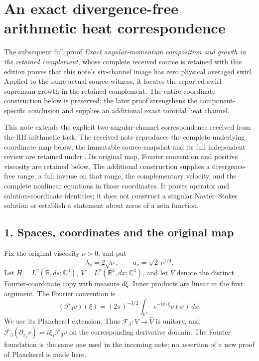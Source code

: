 \section*{An exact divergence-free arithmetic heat correspondence}

The subsequent full proof \emph{Exact angular-momentum composition and growth in the retained complement}, whose complete received source is retained with this edition proves that this note's six-channel image has zero physical averaged swirl. Applied to the same actual source witness, it locates the reported swirl supremum growth in the retained complement. The entire coordinate construction below is preserved; the later proof strengthens the component-specific conclusion and supplies an additional exact toroidal heat channel.

This note extends the explicit two-angular-channel correspondence received from the RH arithmetic task. The received note reproduces the complete underlying coordinate map below; the immutable source snapshot and its full independent review are retained under . Its original map, Fourier convention and positive viscosity are retained below. The additional construction supplies a divergence-free range, a full inverse on that range, the complementary velocity, and the complete nonlinear equations in those coordinates. It proves operator and solution-coordinate identities; it does not construct a singular Navier--Stokes solution or establish a statement about zeros of a zeta function.

\subsection*{1. Spaces, coordinates and the original map}

Fix the original viscosity \(\nu>0\), and put \[
\lambda_\nu=2\sqrt\nu,\qquad a_\nu=\sqrt2\,\nu^{1/4}.
\tag{1}
\] Let \(H=L^2(\mathbb R,ds;\mathbb C^3)\), \(V=L^2(\mathbb R^3,dx;\mathbb C^3)\), and let \(\widehat V\) denote the distinct Fourier-coordinate copy with measure \(d\xi\). Inner products are linear in the first argument. The Fourier convention is \[
(\mathcal F_3v)(\xi)=(2\pi)^{-3/2}\int_{\mathbb R^3}e^{-ix\cdot\xi}v(x)\,dx.
\tag{2}
\] We use its Plancherel extension. Thus \(\mathcal F_3:V\to\widehat V\) is unitary, and \(\mathcal F_3(\partial_{x_j}v)=i\xi_j\mathcal F_3v\) on the corresponding derivative domain. The Fourier foundation is the same one used in the incoming note; no assertion of a new proof of Plancherel is made here.

